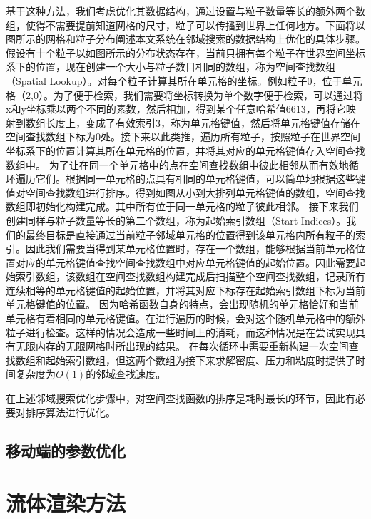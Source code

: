 基于这种方法，我们考虑优化其数据结构，通过设置与粒子数量等长的额外两个数组，使得不需要提前知道网格的尺寸，粒子可以传播到世界上任何地方。下面将以图所示的网格和粒子分布阐述本文系统在邻域搜索的数据结构上优化的具体步骤。
假设有十个粒子以如图所示的分布状态存在，当前只拥有每个粒子在世界空间坐标系下的位置，现在创建一个大小与粒子数目相同的数组，称为空间查找数组（Spatial Lookup）。对每个粒子计算其所在单元格的坐标。例如粒子0，位于单元格（2,0）。为了便于检索，我们需要将坐标转换为单个数字便于检索，可以通过将x和y坐标乘以两个不同的素数，然后相加，得到某个任意哈希值6613，再将它映射到数组长度上，变成了有效索引3，称为单元格键值，然后将单元格键值存储在空间查找数组下标为0处。接下来以此类推，遍历所有粒子，按照粒子在世界空间坐标系下的位置计算其所在单元格的位置，并将其对应的单元格键值存入空间查找数组中。
为了让在同一个单元格中的点在空间查找数组中彼此相邻从而有效地循环遍历它们。根据同一单元格的点具有相同的单元格键值，可以简单地根据这些键值对空间查找数组进行排序。得到如图从小到大排列单元格键值的数组，空间查找数组即初始化构建完成。其中所有位于同一单元格的粒子彼此相邻。
接下来我们创建同样与粒子数量等长的第二个数组，称为起始索引数组（Start Indices）。我们的最终目标是直接通过当前粒子邻域单元格的位置得到该单元格内所有粒子的索引。因此我们需要当得到某单元格位置时，存在一个数组，能够根据当前单元格位置对应的单元格键值查找空间查找数组中对应单元格键值的起始位置。因此需要起始索引数组，该数组在空间查找数组构建完成后扫描整个空间查找数组，记录所有连续相等的单元格键值的起始位置，并将其对应下标存在起始索引数组下标为当前单元格键值的位置。
因为哈希函数自身的特点，会出现随机的单元格恰好和当前单元格有着相同的单元格键值。在进行遍历的时候，会对这个随机单元格中的额外粒子进行检查。这样的情况会造成一些时间上的消耗，而这种情况是在尝试实现具有无限内存的无限网格时所出现的结果。
在每次循环中需要重新构建一次空间查找数组和起始索引数组，但这两个数组为接下来求解密度、压力和粘度时提供了时间复杂度为$O(1)$的邻域查找速度。


在上述邻域搜索优化步骤中，对空间查找函数的排序是耗时最长的环节，因此有必要对排序算法进行优化。


\section{移动端的参数优化}




\chapter{流体渲染方法}

